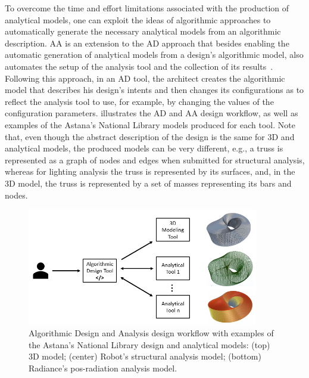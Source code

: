 	To overcome the time and effort limitations associated with the production of analytical models, one can exploit the ideas of algorithmic approaches to automatically generate the necessary analytical models from an algorithmic description. \ac{AA} is an extension to the \ac{AD} approach that besides enabling the automatic generation of analytical models from a design's algorithmic model, also automates the setup of the analysis tool and the collection of its results~\cite{Aguiar2017}. Following this approach, in an \ac{AD} tool, the architect creates the algorithmic model that describes his design's intents and then changes its configurations as to reflect the analysis tool to use, for example, by changing the values of the configuration parameters.  illustrates the \ac{AD} and \ac{AA} design workflow, as well as examples of the Astana's National Library models produced for each tool. Note that, even though the abstract description of the design is the same for 3D and analytical models, the produced models can be very different, e.g., a truss is represented as a graph of nodes and edges when submitted for structural analysis, whereas for lighting analysis the truss is represented by its surfaces, and, in the 3D model, the truss is represented by a set of masses representing its bars and nodes.

\begin{figure}[htbp]
\centering
\includegraphics[width=0.90\textwidth]{./Images/Introduction/AlgorithmicDesignAndAnalysis_w_models.png}
\caption[General view of the Algorithmic Design and Analysis design approach]{Algorithmic Design and Analysis design workflow with examples of the Astana's National Library design and analytical models: (top) 3D model; (center) Robot's structural analysis model; (bottom) Radiance's pos-radiation analysis model.}
\label{fig:algorithmicanalysis}
\end{figure}		
	
